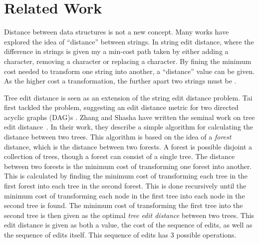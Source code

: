 



\section{Related Work}
\label{sec:related-work}

Distance between data structures is not a new concept. Many works have explored the idea of ``distance'' between strings. In string edit distance, where the difference in strings is given my a min-cost path taken by either adding a character, removing a character or replacing a character. By fining the minimum cost needed to transform one string into another, a ``distance'' value can be given. As the higher cost a transformation, the further apart two strings must be .

Tree edit distance is seen as an extension of the string edit distance problem. Tai first tackled the problem, suggesting an edit distance metric for two directed acyclic graphs (DAG)s \cite{tai_tree--tree_1979}. Zhang and Shasha have written the seminal work on tree edit distance~\cite{zhang_simple_1989}. In their work, they describe a simple algorithm for calculating the distance between two trees. This algorithm is based on the idea of a \textit{forest} distance, which is the distance between two forests. A forest is possible disjoint a collection of trees, though a forest can consist of a single tree. The distance between two forests is the minimum cost of transforming one forest into another. This is calculated by finding the minimum cost of transforming each tree in the first forest into each tree in the second forest. This is done recursively until the minimum cost of transforming each node in the first tree into each node in the second tree is found. The minimum cost of transforming the first tree into the second tree is then given as the optimal \emph{tree edit distance} between two trees. This edit distance is given as both a value, the cost of the sequence of edits, as well as the sequence of edits itself. This sequence of edits has 3 possible operations.

